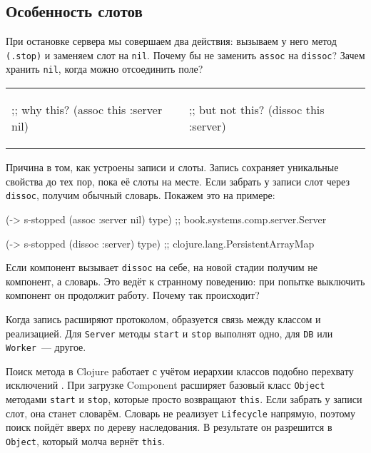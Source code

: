 \subsection{Особенность слотов}

При остановке сервера мы совершаем два действия: вызываем у него метод
\verb|(.stop)| и заменяем слот на \verb|nil|. Почему бы не заменить
\verb|assoc| на \verb|dissoc|? Зачем хранить \verb|nil|, когда можно
отсоединить поле?

\noindent
\begin{tabular}{ @{}p{5cm} @{}p{5cm} }

\begin{english}
  \begin{clojure}
;; why this?
(assoc this :server nil)
  \end{clojure}
\end{english}

&

\begin{english}
  \begin{clojure}
;; but not this?
(dissoc this :server)
  \end{clojure}
\end{english}

\end{tabular}

Причина в том, как устроены записи и слоты. Запись сохраняет уникальные свойства
до тех пор, пока её слоты на месте. Если забрать у записи слот через
\verb|dissoc|, получим обычный словарь. Покажем это на примере:

\begin{english}
  \begin{clojure}
(-> s-stopped
    (assoc :server nil)
    type)
;; book.systems.comp.server.Server

(-> s-stopped
    (dissoc :server)
    type)
;; clojure.lang.PersistentArrayMap
  \end{clojure}
\end{english}

Если компонент вызывает \verb|dissoc| на себе, на новой стадии получим не
компонент, а словарь. Это ведёт к странному поведению: при попытке выключить
компонент он продолжит работу. Почему так происходит?

Когда запись расширяют протоколом, образуется связь между классом и
реализацией. Для \verb|Server| методы \verb|start| и \verb|stop| выполнят
одно, для \verb|DB| или \verb|Worker|~--- другое.

Поиск метода в Clojure работает с учётом иерархии классов подобно перехвату
исключений . При загрузке Component расширяет базовый класс
\verb|Object| методами \verb|start| и \verb|stop|, которые просто
возвращают \verb|this|. Если забрать у записи слот, она станет
словарём. Словарь не реализует \verb|Lifecycle| напрямую, поэтому поиск пойдёт
вверх по дереву наследования. В результате он разрешится в \verb|Object|,
который молча вернёт \verb|this|.

